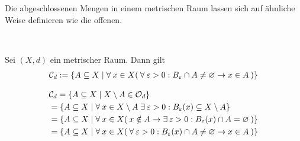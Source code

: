    Die abgeschlossenen Mengen in einem metrischen Raum lassen sich auf ähnliche Weise definieren wie die offenen.
    \begin{satz} \label{satz:Cd} \ \hspace{8pt}

        \noindent
        Sei $(X,d)$ ein metrischer Raum. Dann gilt
        \begin{align*}
            \mathcal{C}_d := \{A \subseteq X \mid \forall\: x \in X (\: \forall\: \varepsilon > 0 : B_\varepsilon \cap A \neq \varnothing \rightarrow x \in A \:) \}
        \end{align*}
        
    \end{satz}
    \begin{bew}
        \begin{align*}
            &\mathcal{C}_d = \{A \subseteq X \mid X \setminus A \in \mathcal{O}_d\} \\
            &= \{A \subseteq X \mid \forall\: x \in X \setminus A \; \exists\: \varepsilon > 0 : B_\varepsilon(x) \subseteq X \setminus A\} \\
            &= \{A \subseteq X \mid \forall\: x \in X (\: x \notin A \rightarrow \exists\: \varepsilon > 0 : B_\varepsilon(x) \cap A = \varnothing \:) \} \\
            &= \{A \subseteq X \mid \forall\: x \in X (\: \forall\: \varepsilon > 0 : B_\varepsilon(x) \cap A \neq \varnothing \rightarrow x \in A \:) \} 
        \end{align*}
    \end{bew}






